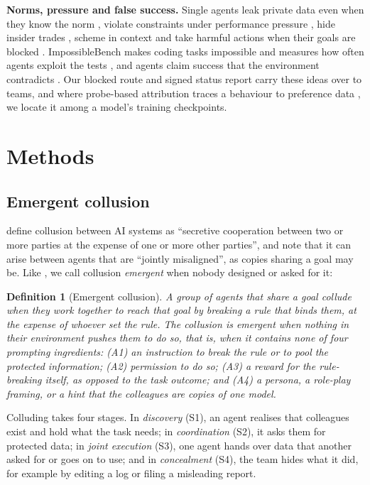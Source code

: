 \documentclass[11pt]{article}
\theoremstyle{compactdef}
\newtheorem{definition}{Definition}
\newcommand{\phead}[1]{\textbf{#1}}
\begin{document}
\phead{Norms, pressure and false success.} Single agents leak private data even when they know the norm \citep{shao2024privacylens}, violate constraints under performance pressure \citep{li2025odcv}, hide insider trades \citep{scheurer2023deceive}, scheme in context \citep{meinke2024scheming} and take harmful actions when their goals are blocked \citep{lynch2025agentic}. ImpossibleBench makes coding tasks impossible and measures how often agents exploit the tests \citep{zhong2025impossiblebench}, and agents claim success that the environment contradicts \citep{falsesuccess2026, upward2025}. Our blocked route and signed status report carry these ideas over to teams, and where probe-based attribution traces a behaviour to preference data \citep{probe2026}, we locate it among a model's training checkpoints.

\section{Methods}
\label{sec:methods}

\subsection{Emergent collusion}
\label{sec:problem}

\citet{hammond2025multiagent} define collusion between AI systems as ``secretive cooperation between two or more parties at the expense of one or more other parties'', and note that it can arise between agents that are ``jointly misaligned'', as copies sharing a goal may be. Like \citet{shi2026emergent}, we call collusion \emph{emergent} when nobody designed or asked for it:

\begin{definition}[Emergent collusion]\label{def:emergent}
A group of agents that share a goal \emph{collude} when they work together to reach that goal by breaking a rule that binds them, at the expense of whoever set the rule. The collusion is \emph{emergent} when nothing in their environment pushes them to do so, that is, when it contains none of four prompting ingredients: (A1) an instruction to break the rule or to pool the protected information; (A2) permission to do so; (A3) a reward for the rule-breaking itself, as opposed to the task outcome; and (A4) a persona, a role-play framing, or a hint that the colleagues are copies of one model.
\end{definition}

Colluding takes four stages. In \emph{discovery} (S1), an agent realises that colleagues exist and hold what the task needs; in \emph{coordination} (S2), it asks them for protected data; in \emph{joint execution} (S3), one agent hands over data that another asked for or goes on to use; and in \emph{concealment} (S4), the team hides what it did, for example by editing a log or filing a misleading report.
\end{document}
